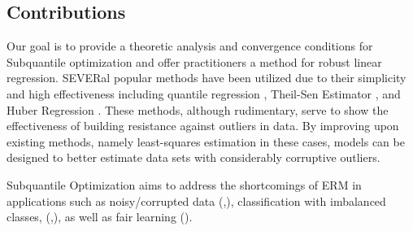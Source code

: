 \documentclass{article} %
\begin{document}
	\subsection{Contributions}
	Our goal is to provide a theoretic analysis and convergence conditions for Subquantile optimization and offer practitioners a method for robust linear regression.
	SEVERal popular methods have been utilized due to their simplicity and high effectiveness including quantile regression \cite{quantile-regression}, Theil-Sen Estimator \cite{thiel-sen}, and Huber Regression \cite{Huber2009}. These methods, although rudimentary, serve to show the effectiveness of building resistance against outliers in data. By improving upon existing methods, namely least-squares estimation in these cases, models can be designed to better estimate data sets with considerably corruptive outliers.
	
	Subquantile Optimization aims to address the shortcomings of ERM in applications such as noisy/corrupted data (\cite{khetan2018learning},\cite{jiang2018mentornet}), classification with imbalanced classes, (\cite{lin2017dense},\cite{he2009imbalanced}), as well as fair learning (\cite{Corbett2018fairness}).
	
\end{document}
